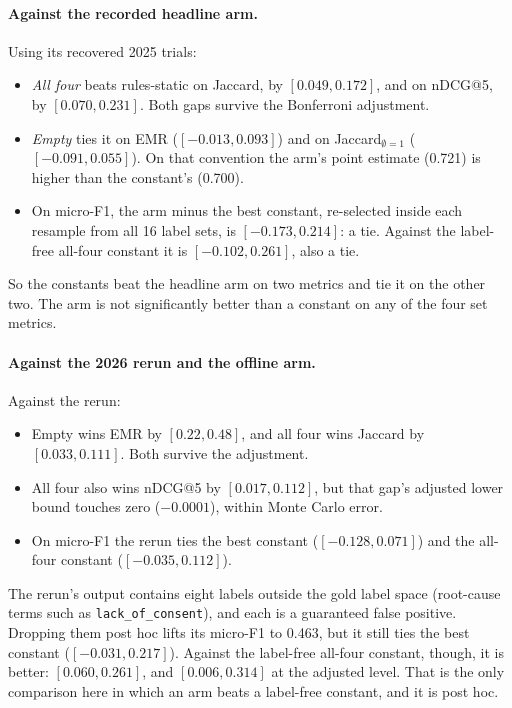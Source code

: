 \documentclass[10pt,twocolumn]{article}
\begin{document}
\paragraph{Against the recorded headline arm.} Using its recovered 2025 trials:
\begin{itemize}
  \item \emph{All four} beats rules-static on Jaccard, by $[0.049, 0.172]$,
        and on nDCG@5, by $[0.070, 0.231]$. Both gaps survive the Bonferroni
        adjustment.
  \item \emph{Empty} ties it on EMR ($[-0.013, 0.093]$) and on
        Jaccard$_{\emptyset=1}$ ($[-0.091, 0.055]$). On that convention the
        arm's point estimate (0.721) is higher than the constant's (0.700).
  \item On micro-F1, the arm minus the best constant, re-selected inside each
        resample from all 16 label sets, is $[-0.173, 0.214]$: a tie.
        Against the label-free all-four constant it is $[-0.102, 0.261]$,
        also a tie.
\end{itemize}
So the constants beat the headline arm on two metrics and tie it on the other
two. The arm is not significantly better than a constant on any of the four
set metrics.

\paragraph{Against the 2026 rerun and the offline arm.} Against the rerun:
\begin{itemize}
  \item Empty wins EMR by $[0.22, 0.48]$, and all four wins Jaccard by
        $[0.033, 0.111]$. Both survive the adjustment.
  \item All four also wins nDCG@5 by $[0.017, 0.112]$, but that gap's
        adjusted lower bound touches zero ($-0.0001$), within Monte Carlo
        error.
  \item On micro-F1 the rerun ties the best constant ($[-0.128, 0.071]$)
        and the all-four constant ($[-0.035, 0.112]$).
\end{itemize}
The rerun's output contains eight labels outside the gold label space
(root-cause terms such as \texttt{lack\_of\_consent}), and each is a
guaranteed false positive. Dropping them post hoc lifts its micro-F1 to 0.463,
but it still ties the best constant ($[-0.031, 0.217]$). Against the
label-free all-four constant, though, it is better: $[0.060, 0.261]$, and
$[0.006, 0.314]$ at the adjusted level. That is the only comparison here in
which an arm beats a label-free constant, and it is post hoc.
\end{document}
